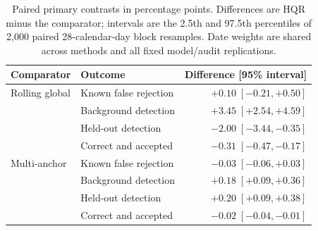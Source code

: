 \begin{table}[tb]
\centering
\small
\caption{Paired primary contrasts in percentage points. Differences are HQR minus the comparator; intervals are the 2.5th and 97.5th percentiles of 2,000 paired 28-calendar-day block resamples. Date weights are shared across methods and all fixed model/audit replications.}
\label{tab:contrasts}
\begin{tabular}{llr}
\toprule
Comparator & Outcome & Difference [95\% interval] \\
\midrule
Rolling global & Known false rejection & $+0.10\;[-0.21, +0.50]$ \\
 & Background detection & $+3.45\;[+2.54, +4.59]$ \\
 & Held-out detection & $-2.00\;[-3.44, -0.35]$ \\
 & Correct and accepted & $-0.31\;[-0.47, -0.17]$ \\
\addlinespace
Multi-anchor & Known false rejection & $-0.03\;[-0.06, +0.03]$ \\
 & Background detection & $+0.18\;[+0.09, +0.36]$ \\
 & Held-out detection & $+0.20\;[+0.09, +0.38]$ \\
 & Correct and accepted & $-0.02\;[-0.04, -0.01]$ \\
\bottomrule
\end{tabular}
\end{table}
